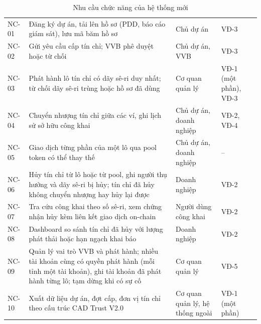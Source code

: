 \begin{table}[!htbp]
    \centering
    \caption{Nhu cầu chức năng của hệ thống mới}
    \label{tab:ks-nhucauchucnang}
    \small
    \begin{tabularx}{\textwidth}{|L{1.3cm}|Y|L{2.8cm}|L{2.1cm}|}
        \hline
         &  &  &  \\
        \hline
        NC-01 & Đăng ký dự án, tải lên hồ sơ (PDD, báo cáo giám sát), lưu mã băm hồ sơ & Chủ dự án & VĐ-3 \\
        \hline
        NC-02 & Gửi yêu cầu cấp tín chỉ; VVB phê duyệt hoặc từ chối & Chủ dự án, VVB & VĐ-3 \\
        \hline
        NC-03 & Phát hành lô tín chỉ có dãy sê-ri duy nhất; từ chối dãy sê-ri trùng hoặc hồ sơ đã dùng & Cơ quan quản lý & VĐ-1 (một phần), VĐ-3 \\
        \hline
        NC-04 & Chuyển nhượng tín chỉ giữa các ví, ghi lịch sử sở hữu công khai & Chủ dự án, doanh nghiệp & VĐ-2, VĐ-4 \\
        \hline
        NC-05 & Giao dịch từng phần của một lô qua pool token có thể thay thế & Chủ dự án, doanh nghiệp & -- \\
        \hline
        NC-06 & Hủy tín chỉ từ lô hoặc từ pool, ghi người thụ hưởng và dãy sê-ri bị hủy; tín chỉ đã hủy không chuyển nhượng hay hủy lại được & Doanh nghiệp & VĐ-2 \\
        \hline
        NC-07 & Tra cứu công khai theo số sê-ri, xem chứng nhận hủy kèm liên kết giao dịch on-chain & Người dùng công khai & VĐ-2 \\
        \hline
        NC-08 & Dashboard so sánh tín chỉ đã hủy với lượng phát thải hoặc hạn ngạch khai báo & Doanh nghiệp & VĐ-2 \\
        \hline
        NC-09 & Quản lý vai trò VVB và phát hành; nhiều tài khoản cùng có quyền phát hành (mỗi tỉnh một tài khoản), ghi tài khoản đã phát hành từng lô; tạm dừng khi có sự cố & Cơ quan quản lý & VĐ-5 \\
        \hline
        NC-10 & Xuất dữ liệu dự án, đợt cấp, đơn vị tín chỉ theo cấu trúc CAD Trust V2.0 & Cơ quan quản lý, hệ thống ngoài & VĐ-1 (một phần) \\
        \hline
    \end{tabularx}
\end{table}

